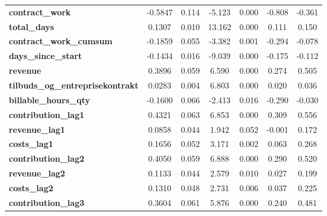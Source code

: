 \begin{center}
\begin{tabular}{lcccccc}
\textbf{contract\_work}                     &      -0.5847  &        0.114     &    -5.123  &         0.000        &       -0.808    &       -0.361     \\
\textbf{total\_days}                        &       0.1307  &        0.010     &    13.162  &         0.000        &        0.111    &        0.150     \\
\textbf{contract\_work\_cumsum}             &      -0.1859  &        0.055     &    -3.382  &         0.001        &       -0.294    &       -0.078     \\
\textbf{days\_since\_start}                 &      -0.1434  &        0.016     &    -9.039  &         0.000        &       -0.175    &       -0.112     \\
\textbf{revenue}                            &       0.3896  &        0.059     &     6.590  &         0.000        &        0.274    &        0.505     \\
\textbf{tilbuds\_og\_entreprisekontrakt}    &       0.0283  &        0.004     &     6.803  &         0.000        &        0.020    &        0.036     \\
\textbf{billable\_hours\_qty}               &      -0.1600  &        0.066     &    -2.413  &         0.016        &       -0.290    &       -0.030     \\
\textbf{contribution\_lag1}                 &       0.4321  &        0.063     &     6.853  &         0.000        &        0.309    &        0.556     \\
\textbf{revenue\_lag1}                      &       0.0858  &        0.044     &     1.942  &         0.052        &       -0.001    &        0.172     \\
\textbf{costs\_lag1}                        &       0.1656  &        0.052     &     3.171  &         0.002        &        0.063    &        0.268     \\
\textbf{contribution\_lag2}                 &       0.4050  &        0.059     &     6.888  &         0.000        &        0.290    &        0.520     \\
\textbf{revenue\_lag2}                      &       0.1133  &        0.044     &     2.579  &         0.010        &        0.027    &        0.199     \\
\textbf{costs\_lag2}                        &       0.1310  &        0.048     &     2.731  &         0.006        &        0.037    &        0.225     \\
\textbf{contribution\_lag3}                 &       0.3604  &        0.061     &     5.876  &         0.000        &        0.240    &        0.481     \\

\end{tabular}
\end{center}
